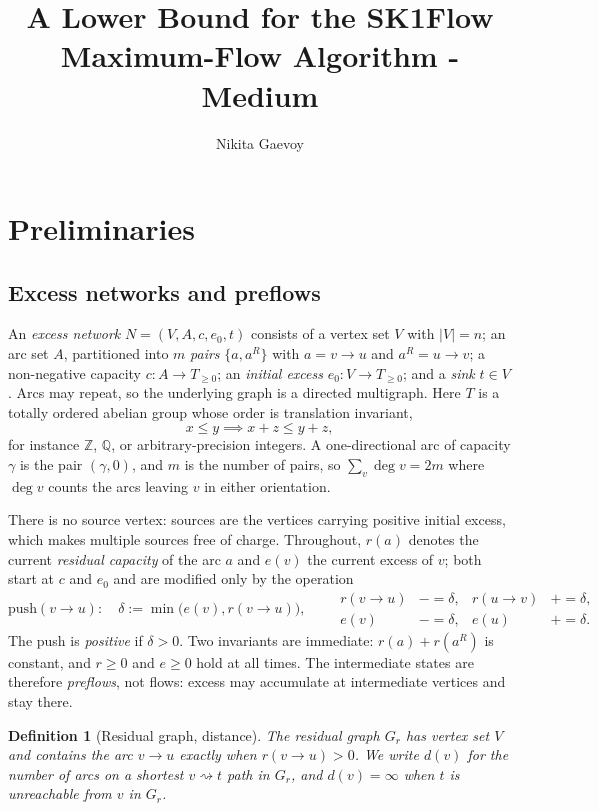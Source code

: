\documentclass[10pt]{article}
\title{A Lower Bound for the SK1Flow Maximum-Flow Algorithm - Medium}
\author{Nikita Gaevoy}
\date{}
\newtheorem{definition}{Definition}
\newcommand{\arc}[2]{#1\!\to\!#2}
\begin{document}
\maketitle

\section{Preliminaries}

\subsection{Excess networks and preflows}

An \emph{excess network} $N=(V,A,c,e_0,t)$ consists of a vertex set $V$ with
$|V|=n$; an arc set $A$, partitioned into $m$ \emph{pairs} $\{a,a^{R}\}$ with
$a=\arc{v}{u}$ and $a^{R}=\arc{u}{v}$; a non-negative capacity
$c\colon A\to T_{\ge0}$; an \emph{initial excess} $e_0\colon V\to T_{\ge0}$; and
a \emph{sink} $t\in V$. Arcs may repeat, so the underlying graph is a directed
multigraph. Here $T$ is a totally ordered abelian group whose order is
translation invariant,
\[
x\le y\implies x+z\le y+z,
\]
for instance $\mathbb{Z}$, $\mathbb{Q}$, or arbitrary-precision integers. A
one-directional arc of capacity $\gamma$ is the pair $(\gamma,0)$, and $m$ is
the number of pairs, so $\sum_{v}\deg v=2m$ where $\deg v$ counts the arcs
leaving $v$ in either orientation.

There is no source vertex: sources are the vertices carrying positive initial
excess, which makes multiple sources free of charge. Throughout, $r(a)$ denotes
the current \emph{residual capacity} of the arc $a$ and $e(v)$ the current
excess of $v$; both start at $c$ and $e_0$ and are modified only by the
operation
\[
  \mathrm{push}(\arc{v}{u})\colon\quad
  \delta:=\min\bigl(e(v),r(\arc{v}{u})\bigr),\qquad
  \begin{aligned}
    r(\arc{v}{u})&\mathrel{-}=\delta, & r(\arc{u}{v})&\mathrel{+}=\delta,\\
    e(v)&\mathrel{-}=\delta,          & e(u)&\mathrel{+}=\delta.
  \end{aligned}
\]
The push is \emph{positive} if $\delta>0$. Two invariants are immediate:
$r(a)+r(a^{R})$ is constant, and $r\ge0$ and $e\ge0$ hold at all times. The
intermediate states are therefore \emph{preflows}, not flows: excess may
accumulate at intermediate vertices and stay there.

\begin{definition}[Residual graph, distance]\label{def:residual}
The \emph{residual graph} $G_r$ has vertex set $V$ and contains the arc
$\arc{v}{u}$ exactly when $r(\arc{v}{u})>0$. We write $d(v)$ for the number of
arcs on a shortest $v\rightsquigarrow t$ path in $G_r$, and $d(v)=\infty$ when
$t$ is unreachable from $v$ in $G_r$.
\end{definition}
\end{document}
